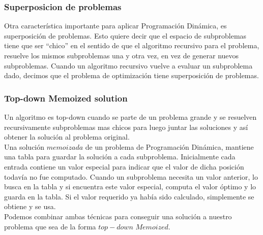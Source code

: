 \subsubsection{Superposicion de problemas}
\indent Otra característica importante para aplicar Programación Dinámica, es superposición de problemas. Esto quiere decir que el espacio de 
subproblemas tiene que ser ``chico'' en el sentido de que el algoritmo recursivo para el problema, resuelve los mismos subproblemas una y otra vez, en vez
de generar nuevos subproblemas. Cuando un algoritmo recursivo vuelve a evaluar un subproblema dado, decimos que el problema de optimización tiene superposición de problemas.

\subsubsection{Top-down Memoized solution}
\indent Un algoritmo es top-down cuando se parte de un problema grande y se resuelven recursivamente subproblemas mas chicos para luego juntar las soluciones y así obtener la solución al problema original.\\
\indent Una solución $memoizada$ de un problema de Programación Dinámica, mantiene una tabla para guardar la solución a cada subproblema. Inicialmente cada
entrada contiene un valor especial para indicar que el valor de dicha posición todavía no fue computado. Cuando un subproblema necesita un valor anterior,
lo busca en la tabla y si encuentra este valor especial, computa el valor óptimo y lo guarda en la tabla. Si el valor requerido ya había sido calculado, simplemente se obtiene y se usa.\\
\indent Podemos combinar ambas técnicas para conseguir una solución a nuestro problema que sea de la forma $top-down$ $Memoized$.











